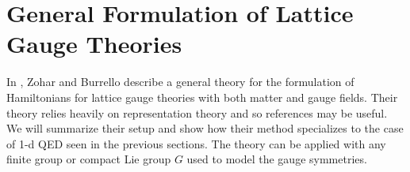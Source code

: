 \documentclass[10pt,reqno]{amsart}
\numberwithin{equation}{section}
\begin{document}
	
	
	
	\section{General Formulation of Lattice Gauge Theories}
	
	In \cite{ZoharBurrello15}, Zohar and Burrello describe a general theory for the formulation of Hamiltonians for lattice gauge theories with both matter and gauge fields. 
	Their theory relies heavily on representation theory and so references \cite{hall_lglarep,teleman_rep_theory} may be useful.
	We will summarize their setup and show how their method specializes to the case of 1-d QED seen in the previous sections.
	The theory can be applied with any finite group or compact Lie group $G$ used to model the gauge symmetries.
	
\end{document}
